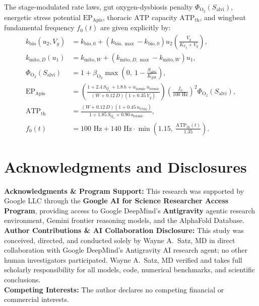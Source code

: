 \documentclass[11pt]{article}
\begin{document}
The stage-modulated rate laws, gut oxygen-dysbiosis penalty $\Phi_{\mathrm{O}_2}(S_{\mathrm{alvi}})$, energetic stress potential $\mathrm{EP}_{\mathrm{Apis}}$, thoracic $\mathrm{ATP}$ capacity $\mathrm{ATP}_{\mathrm{th}}$, and wingbeat fundamental frequency $f_0(t)$ are given explicitly by:
\begin{align}
  k_{\mathrm{bio}}(u_2, V_g) &= k_{\mathrm{bio},0} + \left(k_{\mathrm{bio,\max}} - k_{\mathrm{bio},0}\right)u_2\left(\frac{V_g}{K_{V_g} + V_g}\right), \label{eq:app_kbio}\\
  k_{\mathrm{mito},D}(u_1) &= k_{\mathrm{mito},W} + \left(k_{\mathrm{mito},D,\max} - k_{\mathrm{mito},W}\right)u_1, \label{eq:app_kmito}\\
  \Phi_{\mathrm{O}_2}(S_{\mathrm{alvi}}) &= 1 + \beta_{\mathrm{O}_2}\max\!\left(0,\ 1 - \frac{S_{\mathrm{alvi}}}{K_{\mathrm{gut}}}\right), \label{eq:app_PhiO2}\\
  \mathrm{EP}_{\mathrm{Apis}} &= \left(\frac{1 + 2.4\,S_{Q_o} + 1.8\,h + \alpha_{\mathrm{formic}}\,u_{\mathrm{formic}}}{(W + 0.12\,D)(1 + 0.35\,V_g)}\right)\left(\frac{f_0}{100\text{ Hz}}\right)^2 \Phi_{\mathrm{O}_2}(S_{\mathrm{alvi}}), \label{eq:app_EP}\\
  \mathrm{ATP}_{\mathrm{th}} &= \frac{(W + 0.12\,D)(1 + 0.45\,u_{\mathrm{Ubiq}})}{1 + 1.85\,S_{Q_o} + 0.90\,u_{\mathrm{formic}}}, \label{eq:app_ATP}\\
  f_0(t) &= 100\text{ Hz} + 140\text{ Hz}\cdot\min\!\left(1.15,\ \frac{\mathrm{ATP}_{\mathrm{th}}(t)}{1.35}\right). \label{eq:app_f0}
\end{align}

\section*{Acknowledgments and Disclosures}
\small
\noindent\textbf{Acknowledgments \& Program Support:} This research was supported by Google LLC through the \textbf{Google AI for Science Researcher Access Program}, providing access to Google DeepMind's \textbf{Antigravity} agentic research environment, Gemini frontier reasoning models, and the AlphaFold Database.\\[0.25em]
\noindent\textbf{Author Contributions \& AI Collaboration Disclosure:} This study was conceived, directed, and conducted solely by Wayne A.~Satz, MD in direct collaboration with Google DeepMind's Antigravity AI research agent; no other human investigators participated. Wayne A.~Satz, MD verified and takes full scholarly responsibility for all models, code, numerical benchmarks, and scientific conclusions.\\[0.25em]
\noindent\textbf{Competing Interests:} The author declares no competing financial or commercial interests.



\end{document}
